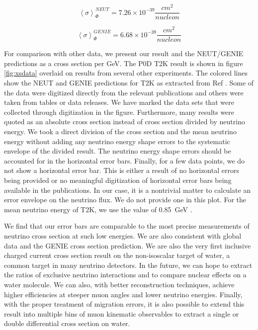 \begin{equation}
\left<\sigma\right>_\Phi^{NEUT} = 7.26 \times 10^{-39} \frac{cm^2}{nucleon}
\end{equation}

\begin{equation}
\left<\sigma\right>_\Phi^{GENIE} = 6.68 \times 10^{-39} \frac{cm^2}{nucleon}
\end{equation}

For comparison with other data, we present our result and the NEUT/GENIE predictions as a cross section per GeV. The P0D T2K result is shown in figure \ref{fig:xsdata} overlaid on results from several other experiments. The colored lines show the NEUT and GENIE predictions for T2K as extracted from Ref \cite{ccinc}. Some of the data were digitized directly from the relevant publications and others were taken from tables or data releases. We have marked the data sets that were collected through digitization in the figure. Furthermore, many results were quoted as an absolute cross section instead of cross section divided by neutrino energy. We took a direct division of the cross section and the mean neutrino energy without adding any neutrino energy shape errors to the systematic envelope of the divided result. The neutrino energy shape errors should be accounted for in the horizontal error bars. Finally, for a few data points, we do not show a horizontal error bar. This is either a result of no horizontal errors being provided or no meaningful digitization of horizontal error bars being available in the publications. In our case, it is a nontrivial matter to calculate an error envelope on the neutrino flux. We do not provide one in this plot. For the mean neutrino energy of T2K, we use the value of 0.85~GeV \cite{ccinc}.

We find that our error bars are comparable to the most precise measurements of neutrino cross section at such low energies. We are also consistent with global data and the GENIE cross section prediction. We are also the very first inclusive charged current cross section result on the non-isoscalar target of water, a common target in many neutrino detectors. In the future, we can hope to extract the ratios of exclusive neutrino interactions and to compare nuclear effects on a water molecule. We can also, with better reconstruction techniques, achieve higher efficiencies at steeper muon angles and lower neutrino energies. Finally, with the proper treatment of migration errors, it is also possible to extend this result into multiple bins of muon kinematic observables to extract a single or double differential cross section on water.

